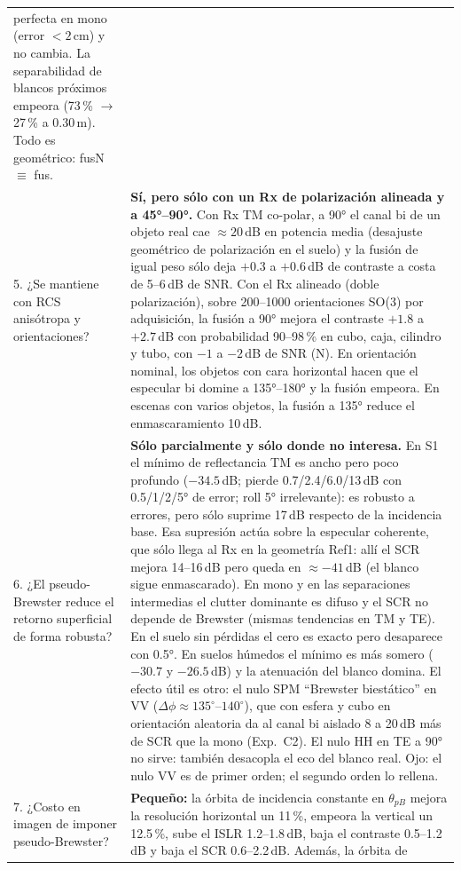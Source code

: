 \begin{longtable}{@{}L{4.3cm}L{10.2cm}@{}}
perfecta en mono (error $<2$\,cm) y no cambia. La separabilidad de blancos próximos
empeora (73\,\% $\to$ 27\,\% a 0.30\,m). Todo es geométrico: fusN $\equiv$ fus. \\
5. ¿Se mantiene con RCS anisótropa y orientaciones? &
\textbf{Sí, pero sólo con un Rx de polarización alineada y a 45°--90°.}
Con Rx TM co-polar, a 90° el canal bi de un objeto real cae $\approx20$\,dB en
potencia media (desajuste geométrico de polarización en el suelo) y la fusión de igual
peso sólo deja $+0.3$ a $+0.6$\,dB de contraste a costa de 5--6\,dB de SNR. Con el Rx
alineado (doble polarización), sobre 200--1000 orientaciones SO(3) por adquisición, la
fusión a 90° mejora el contraste $+1.8$ a $+2.7$\,dB con probabilidad 90--98\,\% en cubo,
caja, cilindro y tubo, con $-1$ a $-2$\,dB de SNR (N). En orientación nominal, los objetos
con cara horizontal hacen que el especular bi domine a 135°--180° y la fusión empeora.
En escenas con varios objetos, la fusión a 135° reduce el enmascaramiento 10\,dB.
\\
6. ¿El pseudo-Brewster reduce el retorno superficial de forma robusta? &
\textbf{Sólo parcialmente y sólo donde no interesa.} En S1 el mínimo de reflectancia
TM es ancho pero poco profundo ($-34.5$\,dB; pierde 0.7/2.4/6.0/13\,dB con 0.5/1/2/5°
de error; roll 5° irrelevante): es robusto a errores, pero sólo suprime 17\,dB respecto de
la incidencia base. Esa supresión actúa sobre la especular coherente, que sólo llega al
Rx en la geometría Ref1: allí el SCR mejora 14--16\,dB pero queda en $\approx-41$\,dB (el blanco
sigue enmascarado). En mono y en las separaciones intermedias el clutter dominante es
difuso y el SCR no depende de Brewster (mismas tendencias en TM y TE). En el suelo sin
pérdidas el cero es exacto pero desaparece con 0.5°. En suelos húmedos el mínimo es más
somero ($-30.7$ y $-26.5$\,dB) y la atenuación del blanco domina. El efecto útil es
otro: el nulo SPM ``Brewster biestático'' en VV ($\Delta\phi\approx135^{\circ}$--$140^{\circ}$), que con
esfera y cubo en orientación aleatoria da al canal bi aislado 8 a 20\,dB más de SCR que la mono
(Exp.~C2). El nulo HH en TE a 90° no sirve: también desacopla el eco del blanco real. Ojo: el
nulo VV es de primer orden; el segundo orden lo rellena.
\\
7. ¿Costo en imagen de imponer pseudo-Brewster? &
\textbf{Pequeño:} la órbita de incidencia constante en $\theta_{pB}$ mejora la
resolución horizontal un 11\,\%, empeora la vertical un 12.5\,\%, sube el ISLR 1.2--1.8\,dB,
baja el contraste 0.5--1.2\,dB y baja el SCR 0.6--2.2\,dB. Además, la órbita de

\end{longtable}
